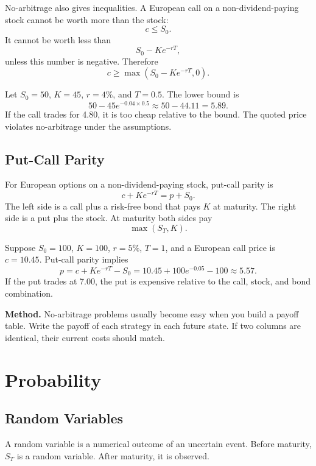 No-arbitrage also gives inequalities. A European call on a non-dividend-paying
stock cannot be worth more than the stock:
\[
    c \leq S_0.
\]
It cannot be worth less than
\[
    S_0-Ke^{-rT},
\]
unless this number is negative. Therefore
\[
    c \geq \max(S_0-Ke^{-rT},0).
\]

\begin{exmp}
Let $S_0=50$, $K=45$, $r=4\%$, and $T=0.5$. The lower bound is
\[
    50-45e^{-0.04\times 0.5}
    \approx 50-44.11
    =
    5.89.
\]
If the call trades for 4.80, it is too cheap relative to the bound. The quoted
price violates no-arbitrage under the assumptions.
\end{exmp}

\subsection{Put-Call Parity}

For European options on a non-dividend-paying stock, put-call parity is
\[
    c + Ke^{-rT} = p + S_0.
\]
The left side is a call plus a risk-free bond that pays $K$ at maturity. The
right side is a put plus the stock. At maturity both sides pay
\[
    \max(S_T,K).
\]

\begin{exmp}
Suppose $S_0=100$, $K=100$, $r=5\%$, $T=1$, and a European call price is
$c=10.45$. Put-call parity implies
\[
    p = c + Ke^{-rT} - S_0
    = 10.45 + 100e^{-0.05} - 100
    \approx 5.57.
\]
If the put trades at 7.00, the put is expensive relative to the call, stock, and
bond combination.
\end{exmp}

\begin{boxD}
\textbf{Method.} No-arbitrage problems usually become easy when you build a
payoff table. Write the payoff of each strategy in each future state. If two
columns are identical, their current costs should match.
\end{boxD}

\section{Probability}

\subsection{Random Variables}

A random variable is a numerical outcome of an uncertain event. Before maturity,
$S_T$ is a random variable. After maturity, it is observed.

